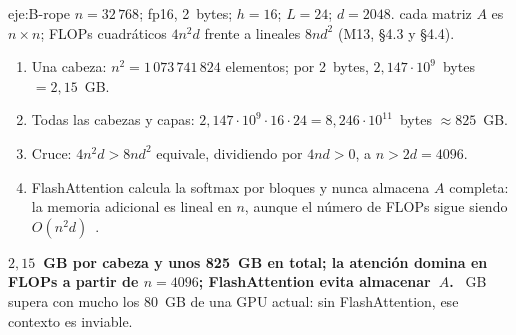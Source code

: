 \begin{solucion}{eje:B-rope}
\datos $n=32\,768$; fp16, 2~bytes; $h=16$; $L=24$; $d=2048$.
\planteamiento cada matriz $A$ es $n\times n$; FLOPs cuadráticos $4n^{2}d$ frente a lineales $8nd^{2}$ (M13, §4.3 y §4.4).
\pasos
\begin{enumerate}[label=\arabic*.]
  \item Una cabeza: $n^{2}=1\,073\,741\,824$ elementos; por 2~bytes, $2{,}147\cdot 10^{9}$~bytes $=2{,}15$~GB.
  \item Todas las cabezas y capas: $2{,}147\cdot 10^{9}\cdot 16\cdot 24=8{,}246\cdot 10^{11}$~bytes $\approx 825$~GB.
  \item Cruce: $4n^{2}d>8nd^{2}$ equivale, dividiendo por $4nd>0$, a $n>2d=4096$.
  \item FlashAttention calcula la softmax por bloques y nunca almacena $A$ completa: la memoria adicional es lineal en $n$, aunque el número de FLOPs sigue siendo $O(n^{2}d)$~\cite{dao}.
\end{enumerate}
\resultado \textbf{$2{,}15$~GB por cabeza y unos 825~GB en total; la atención domina en FLOPs a partir de $n=4096$; FlashAttention evita almacenar~$A$.}
~GB supera con mucho los 80~GB de una GPU actual: sin FlashAttention, ese contexto es inviable.

\end{solucion}

